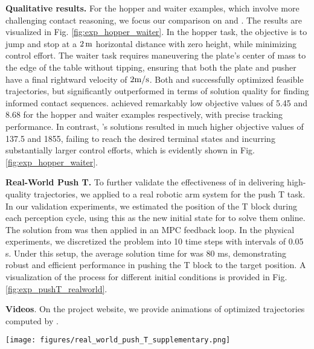\textbf{Qualitative results. }
For the hopper and waiter examples, which involve more challenging contact reasoning, we focus our comparison on \crisp and \ipopt. The results are visualized in Fig. \ref{fig:exp_hopper_waiter}.
In the hopper task, the objective is to jump and stop at a $2\,\textup{m}$ horizontal distance with zero height, while minimizing control effort. The waiter task requires maneuvering the plate's center of mass to the edge of the table without tipping, ensuring that both the plate and pusher have a final rightward velocity of $2 \textup{m}/\textup{s}$. Both \ipopt and \crisp successfully optimized feasible trajectories, but \crisp significantly outperformed \ipopt in terms of solution quality for finding informed contact sequences. \crisp achieved remarkably low objective values of 5.45 and 8.68 for the hopper and waiter examples respectively, with precise tracking performance. In contrast, \ipopt's solutions resulted in much higher objective values of 137.5 and 1855, failing to reach the desired terminal states and incurring substantially larger control efforts, which is evidently shown in Fig. \ref{fig:exp_hopper_waiter}.

\textbf{Real-World Push T. }
To further validate the effectiveness of \crisp in delivering high-quality trajectories, we applied \crisp to a real robotic arm system for the push T task. In our validation experiments, we estimated the position of the T block during each perception cycle, using this as the new initial state for \crisp to solve them online. The solution from \crisp was then applied in an MPC feedback loop. In the physical experiments, we discretized the problem into 10 time steps with intervals of 0.05 \textup{s}. Under this setup, the average solution time for \crisp was 80 \textup{ms}, demonstrating robust and efficient performance in pushing the T block to the target position. A visualization of the process for different initial conditions is provided in Fig. \ref{fig:exp_pushT_realworld}.

\textbf{Videos}. On the project website, we provide animations of optimized trajectories computed by \crisp.

\begin{figure*}[t] 
    \centering
    \texttt{[image: figures/real\_world\_push\_T\_supplementary.png]}
    \caption{Key frames visualization of the real-world Push T experiments from various initial configurations (each row). Videos of the results can be found on the project website.}
    \label{fig:exp_pushT_realworld}
\end{figure*}


